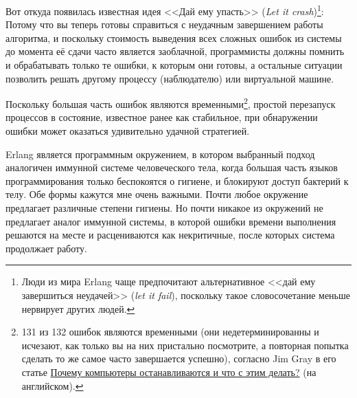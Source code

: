 Вот откуда появилась известная идея <<Дай ему упасть>> (\emph{Let it crash})\footnote{Люди из мира Erlang чаще предпочитают альтернативное <<дай ему завершиться неудачей>> (\emph{let it fail}), поскольку такое словосочетание меньше нервирует других людей.}: Потому что вы теперь готовы справиться с неудачным завершением работы алгоритма, и поскольку стоимость выведения всех сложных ошибок из системы до момента её сдачи часто является заоблачной, программисты должны помнить и обрабатывать только те ошибки, к которым они готовы, а остальные ситуации позволить решать другому процессу (наблюдателю) или виртуальной машине.

Поскольку большая часть ошибок являются временными\footnote{131 из 132 ошибок являются временными (они недетерминированны и исчезают, как только вы на них пристально посмотрите, а повторная попытка сделать то же самое часто завершается успешно), согласно Jim Gray в его статье \href{http://www.hpl.hp.com/techreports/tandem/TR-85.7.html}{Почему компьютеры останавливаются и что с этим делать?} (на английском).}, простой перезапуск процессов в состояние, известное ранее как стабильное, при обнаружении ошибки может оказаться удивительно удачной стратегией.

Erlang является программным окружением, в котором выбранный подход аналогичен иммун\-ной системе человеческого тела, когда большая часть языков программирования только беспоко\-ятся о гигиене, и блокируют доступ бактерий к телу. Обе формы кажутся мне очень важными. Почти любое окружение предлагает различные степени гигиены. Но почти никакое из окружений не предлагает аналог иммунной системы, в которой ошибки времени выполнения решаются на месте и расцениваются как некритичные, после которых система продолжает работу.

